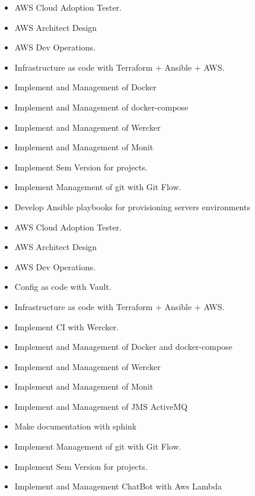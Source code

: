 \documentclass[10pt,a4paper]{altacv}
\begin{document}
\begin{itemize}
\item AWS Cloud Adoption Tester.
  \item AWS Architect Design
  \item AWS Dev Operations.
  \item Infrastructure as code with Terraform + Ansible + AWS.
  \item Implement and Management of Docker
  \item Implement and Management of docker-compose
  \item Implement and Management of Wercker
  \item Implement and Management of Monit
  \item Implement Sem Version for projects.
  \item Implement Management of git with Git Flow.
\end{itemize}

\divider

\begin{itemize}
  \item Develop Ansible playbooks for provisioning servers environments
  \item AWS Cloud Adoption Tester.
  \item AWS Architect Design
  \item AWS Dev Operations.
  \item Config as code with Vault.
  \item Infrastructure as code with Terraform + Ansible + AWS.
  \item Implement CI with Wercker.
  \item Implement and Management of Docker and docker-compose
  \item Implement and Management of Wercker
  \item Implement and Management of Monit
  \item Implement and Management of JMS ActiveMQ
  \item Make documentation with sphink
  \item Implement Management of git with Git Flow.
  \item Implement Sem Version for projects.
  \item Implement and Management ChatBot with Aws Lambda
\end{itemize}
\end{document}
